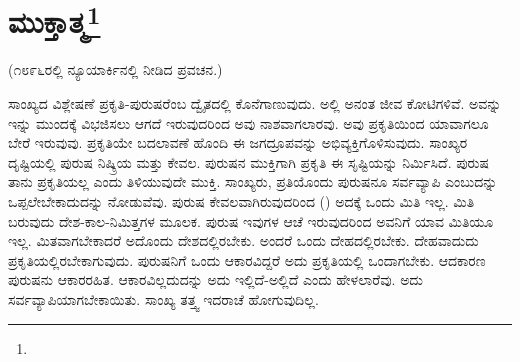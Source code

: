 
\chapter[ಮುಕ್ತಾತ್ಮ]{ಮುಕ್ತಾತ್ಮ\protect\footnote{}}

\begin{center}
(೧೮೯೬ರಲ್ಲಿ ನ್ಯೂಯಾರ್ಕಿನಲ್ಲಿ ನೀಡಿದ ಪ್ರವಚನ.)
\end{center}

ಸಾಂಖ್ಯದ ವಿಶ್ಲೇಷಣೆ ಪ್ರಕೃತಿ-ಪುರುಷರೆಂಬ ದ್ವೈತದಲ್ಲಿ ಕೊನೆಗಾಣುವುದು. ಅಲ್ಲಿ ಅನಂತ ಜೀವ ಕೋಟಿಗಳಿವೆ. ಅವನ್ನು ಇನ್ನು ಮುಂದಕ್ಕೆ ವಿಭಜಿಸಲು ಆಗದೆ ಇರುವುದರಿಂದ ಅವು ನಾಶವಾಗಲಾರವು. ಅವು ಪ್ರಕೃತಿಯಿಂದ ಯಾವಾಗಲೂ ಬೇರೆ ಇರುವುವು. ಪ್ರಕೃತಿಯೇ ಬದಲಾವಣೆ ಹೊಂದಿ ಈ ಜಗದ್ರೂಪವನ್ನು ಅಭಿವ್ಯಕ್ತಿಗೊಳಿಸುವುದು. ಸಾಂಖ್ಯರ ದೃಷ್ಟಿಯಲ್ಲಿ ಪುರುಷ ನಿಷ್ಕ್ರಿಯ ಮತ್ತು ಕೇವಲ. ಪುರುಷನ ಮುಕ್ತಿಗಾಗಿ ಪ್ರಕೃತಿ ಈ ಸೃಷ್ಟಿಯನ್ನು ನಿರ್ಮಿಸಿದೆ. ಪುರುಷ ತಾನು ಪ್ರಕೃತಿಯಲ್ಲ ಎಂದು ತಿಳಿಯುವುದೇ ಮುಕ್ತಿ. ಸಾಂಖ್ಯರು, ಪ್ರತಿಯೊಂದು ಪುರುಷನೂ ಸರ್ವವ್ಯಾಪಿ ಎಂಬುದನ್ನು ಒಪ್ಪಲೇಬೇಕಾದುದನ್ನು ನೋಡುವೆವು. ಪುರುಷ ಕೇವಲವಾಗಿರುವುದರಿಂದ () ಅದಕ್ಕೆ ಒಂದು ಮಿತಿ ಇಲ್ಲ. ಮಿತಿ ಬರುವುದು ದೇಶ-ಕಾಲ-ನಿಮಿತ್ತಗಳ ಮೂಲಕ. ಪುರುಷ ಇವುಗಳ ಆಚೆ ಇರುವುದರಿಂದ ಅವನಿಗೆ ಯಾವ ಮಿತಿಯೂ ಇಲ್ಲ. ಮಿತವಾಗಬೇಕಾದರೆ ಅದೊಂದು ದೇಶದಲ್ಲಿರಬೇಕು. ಅಂದರೆ ಒಂದು ದೇಹದಲ್ಲಿರಬೇಕು. ದೇಹವಾದುದು ಪ್ರಕೃತಿಯಲ್ಲಿರಬೇಕಾಗುವುದು. ಪುರುಷನಿಗೆ ಒಂದು ಆಕಾರವಿದ್ದರೆ ಅದು ಪ್ರಕೃತಿಯಲ್ಲಿ ಒಂದಾಗಬೇಕು. ಆದಕಾರಣ ಪುರುಷನು ಆಕಾರರಹಿತ. ಆಕಾರವಿಲ್ಲದುದನ್ನು ಅದು ಇಲ್ಲಿದೆ-ಅಲ್ಲಿದೆ ಎಂದು ಹೇಳಲಾರೆವು. ಅದು ಸರ್ವವ್ಯಾಪಿಯಾಗಬೇಕಾಯಿತು. ಸಾಂಖ್ಯ ತತ್ತ್ವ ಇದರಾಚೆ ಹೋಗುವುದಿಲ್ಲ.

